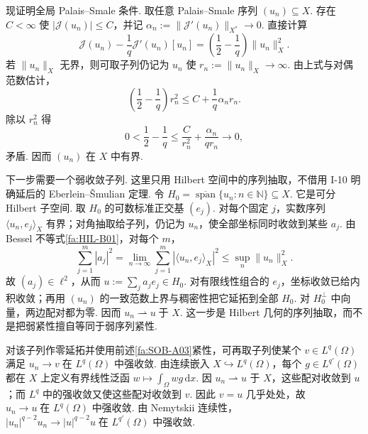 现证明全局 Palais--Smale 条件. 取任意 Palais--Smale 序列 \(\displaystyle(u_n)\subseteq X\). 存在 \(\displaystyle C<\infty\) 使 \(\displaystyle|\mathcal J(u_n)|\leqslant C\)，并记 \(\displaystyle\alpha_n:=\|\mathcal J'(u_n)\|_{X^*}\to0\). 直接计算
\[
\mathcal J(u_n)-\frac{1}{q}\mathcal J'(u_n)[u_n]
=
\left(\frac{1}{2}-\frac{1}{q}\right)\|u_n\|_X^2.
\]
若 \(\displaystyle\|u_n\|_X\) 无界，则可取子列仍记为 \(\displaystyle u_n\) 使 \(\displaystyle r_n:=\|u_n\|_X\to\infty\). 由上式与对偶范数估计，
\[
\left(\frac{1}{2}-\frac{1}{q}\right)r_n^2
\leqslant
C+
\frac{1}{q}\alpha_nr_n.
\]
除以 \(\displaystyle r_n^2\) 得
\[
0<\frac{1}{2}-\frac{1}{q}
\leqslant
\frac{C}{r_n^2}
+
\frac{\alpha_n}{qr_n}
\longrightarrow0,
\]
矛盾. 因而 \(\displaystyle(u_n)\) 在 \(\displaystyle X\) 中有界.

下一步需要一个弱收敛子列. 这里只用 Hilbert 空间中的序列抽取，不借用 I-10 明确延后的 Eberlein--\v Smulian 定理. 令 \(\displaystyle H_0=\overline{\operatorname{span}}\{u_n:n\in\mathbb N\}\subseteq X\). 它是可分 Hilbert 子空间. 取 \(\displaystyle H_0\) 的可数标准正交基 \(\displaystyle(e_j)\). 对每个固定 \(\displaystyle j\)，实数序列 \(\displaystyle\langle u_n,e_j\rangle_X\) 有界；对角抽取给子列，仍记为 \(\displaystyle u_n\)，使全部坐标同时收敛到某些 \(\displaystyle a_j\). 由 Bessel 不等式\autoref{fa:HIL-B01}，对每个 \(\displaystyle m\)，
\[
\sum_{j=1}^m|a_j|^2
=
\lim_{n\to\infty}
\sum_{j=1}^m|\langle u_n,e_j\rangle_X|^2
\leqslant
\sup_n\|u_n\|_X^2.
\]
故 \(\displaystyle(a_j)\in\ell^2\)，从而 \(\displaystyle u:=\sum_j a_je_j\in H_0\). 对有限线性组合的 \(\displaystyle e_j\)，坐标收敛已给内积收敛；再用 \(\displaystyle(u_n)\) 的一致范数上界与稠密性把它延拓到全部 \(\displaystyle H_0\). 对 \(\displaystyle H_0^\perp\) 中向量，两边配对都为零. 因而
\(\displaystyle u_n\rightharpoonup u \;\text{于 }X\).
这一步是 Hilbert 几何的序列抽取，而不是把弱紧性擅自等同于弱序列紧性.

对该子列作零延拓并使用前述\autoref{fa:SOB-A03}紧性，可再取子列使某个 \(\displaystyle v\in L^q(\Omega)\) 满足
\(\displaystyle u_n\longrightarrow v \;\text{在 }L^q(\Omega)\text{ 中强收敛}\).
由连续嵌入 \(\displaystyle X\hookrightarrow L^q(\Omega)\)，每个 \(\displaystyle g\in L^{q'}(\Omega)\) 都在 \(\displaystyle X\) 上定义有界线性泛函 \(\displaystyle w\mapsto\int_\Omega wg\,\mathrm{d}x\). 因 \(\displaystyle u_n\rightharpoonup u\) 于 \(\displaystyle X\)，这些配对收敛到 \(\displaystyle u\)；而 \(\displaystyle L^q\) 中的强收敛又使这些配对收敛到 \(\displaystyle v\). 因此 \(\displaystyle v=u\) 几乎处处，故
\(\displaystyle u_n\longrightarrow u \;\text{在 }L^q(\Omega)\text{ 中强收敛}\).
由 Nemytskii 连续性，
\(\displaystyle |u_n|^{q-2}u_n \longrightarrow |u|^{q-2}u \;\text{在 }L^{q'}(\Omega)\text{ 中强收敛}\).


